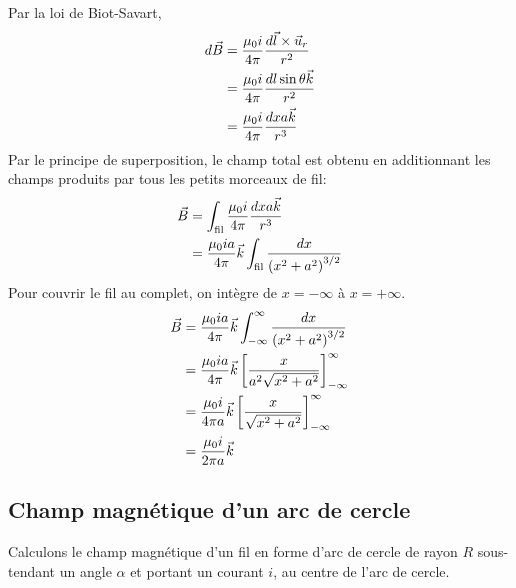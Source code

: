 Par la loi de Biot-Savart,
\begin{align*}
  d\vec{B} &= \frac{\mu_0 i}{4\pi} \frac{d\vec{l} \times \vec{u}_r}{r^2} \\
       &= \frac{\mu_0 i}{4\pi} \frac{dl \sin\theta \vec{k}}{r^2} \\
       &= \frac{\mu_0 i}{4\pi} \frac{dx a \vec{k}}{r^3}
\end{align*}
Par le principe de superposition, le champ total est obtenu en additionnant
les champs produits par tous les petits morceaux de fil:
\begin{align*}
  \vec{B} &= \int_\mathrm{fil} \frac{\mu_0 i}{4\pi} \frac{dx a \vec{k}}{r^3} \\
      &= \frac{\mu_0 i a}{4\pi} \vec{k} \int_\mathrm{fil} \frac{dx}{\left(x^2 +
          a^2\right)^{3/2}}
\end{align*}
Pour couvrir le fil au complet, on intègre de $x = -\infty$ à $x = +\infty$.
\begin{align*}
  \vec{B} &= \frac{\mu_0 i a}{4\pi} \vec{k} \int_{-\infty}^\infty
           \frac{dx}{\left(x^2 + a^2\right)^{3/2}}  \\
      &= \frac{\mu_0 i a}{4\pi} \vec{k} 
           \left[\frac{x}{a^2 \sqrt{x^2 + a^2}}\right]_{-\infty}^{\infty}  \\
      &= \frac{\mu_0 i}{4\pi a} \vec{k} 
           \left[\frac{x}{\sqrt{x^2 + a^2}}\right]_{-\infty}^{\infty}  \\
      &= \frac{\mu_0 i}{2\pi a} \vec{k} 
\end{align*}



\subsection*{Champ magnétique d'un arc de cercle}

Calculons le champ magnétique d'un fil en forme d'arc de cercle de rayon $R$
sous-tendant un angle $\alpha$ et portant un courant $i$, au centre de l'arc de
cercle.

